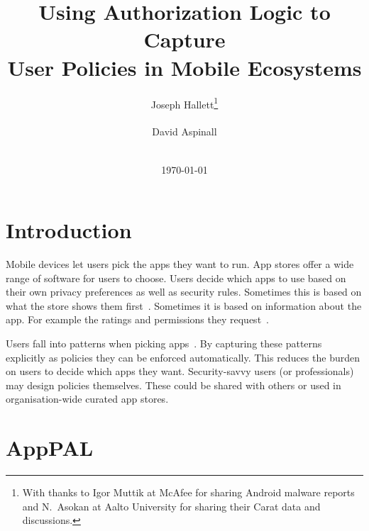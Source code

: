 \documentclass[]{soups-poster}
\newcommand{\citep}[1]{\cite{#1}}
\begin{document}
\title{Using Authorization Logic to Capture\\User Policies in Mobile Ecosystems}
\author{%
  \alignauthor{}
  Joseph Hallett\thanks{With thanks to Igor Muttik at McAfee for sharing Android malware reports and N{.}~Asokan at Aalto University for sharing their Carat data and discussions.}\\
  \\
  \alignauthor{}
  David Aspinall\\
  \\
}
\date\today
\maketitle

\section{Introduction}

Mobile devices let users pick the apps they want to run.
App stores offer a wide range of software for users to choose.
Users decide which apps to use based on their own privacy preferences as well as security rules. %
Sometimes this is based on what the store shows them first~\citep{Prata:2012in}.
Sometimes it is based on information about the app.
For example the ratings and permissions they request~\citep{Kelley:2013kc}.

Users fall into patterns when picking apps~\citep{Sadeh:2014vq}.
By capturing these patterns explicitly as policies they can be enforced automatically. 
This reduces the burden on users to decide which apps they want.
Security-savvy users (or professionals) may design policies themselves.
These could be shared with others or used in organisation-wide curated app stores.

%

\section{AppPAL}
\end{document}

